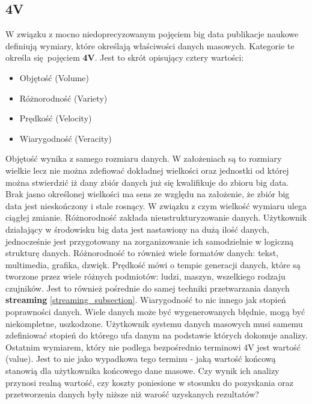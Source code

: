 \subsection{4V}
W związku z mocno niedoprecyzowanym pojęciem big data publikacje naukowe definiują wymiary, które określają właściwości danych masowych.\cite{big_data_great_services} Kategorie te określa się pojęciem \textbf{4V}. Jest to skrót opisujący cztery wartości:
\begin{itemize}
	\item Objętość (Volume)
	\item Różnorodność (Variety)
	\item Prędkość (Velocity)
	\item Wiarygodność (Veracity)
\end{itemize}
Objętość wynika z samego rozmiaru danych. W założeniach są to rozmiary wielkie lecz nie można zdefiować dokładnej wielkości oraz jednostki od której można stwierdzić iż dany zbiór danych już się kwalifikuje do zbioru big data. Brak jasno określonej wielkości ma sens ze względu na założenie, że zbiór big data jest nieskończony i stale rosnący. W związku z czym wielkość wymiaru ulega ciągłej zmianie.\newline
Różnorodność zakłada nieustrukturyzowanie danych. Użytkownik działający w środowisku big data jest nastawiony na dużą ilość danych, jednocześnie jest przygotowany na zorganizowanie ich samodzielnie w logiczną strukturę danych. Różnorodność to również wiele formatów danych: tekst, multimedia, grafika, dzwięk.\newline
Prędkość mówi o tempie generacji danych, które są tworzone przez wiele różnych podmiotów: ludzi, maszyn, wszelkiego rodzaju czujników. Jest to również pośrednie do samej techniki przetwarzania danych \textbf{streaming} \ref{streaming_subsection}.\newline
Wiarygodność to nic innego jak stopień poprawności danych. Wiele danych może być wygenerowanych błędnie, mogą być niekompletne, uszkodzone. Użytkownik systemu danych masowych musi samemu zdefiniować stopień do którego ufa danym na podstawie których dokonuje analizy.\newline
Ostatnim wymiarem, który nie podlega bezpośrednio terminowi 4V jest wartość (value). Jest to nie jako wypadkowa tego terminu - jaką wartość końcową stanowią dla użytkownika końcowego dane masowe. Czy wynik ich analizy przynosi realną wartość, czy koszty poniesione w stosunku do pozyskania oraz przetworzenia danych były niższe niż warość uzyskanych rezultatów?
